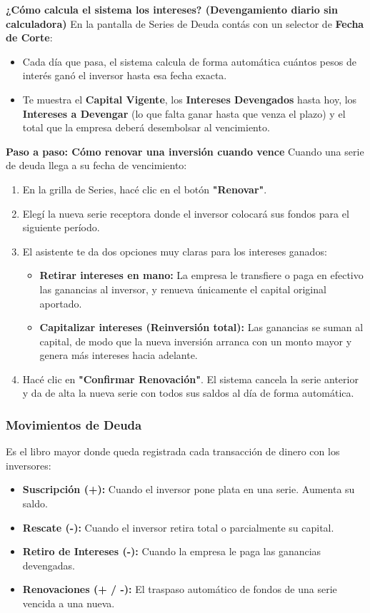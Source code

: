 \documentclass[12pt,a4paper]{article}
\renewcommand{\_}{\textunderscore\allowbreak}
\begin{document}
\textbf{¿Cómo calcula el sistema los intereses? (Devengamiento diario sin calculadora)}
En la pantalla de Series de Deuda contás con un selector de \textbf{Fecha de Corte}:
\begin{itemize}
    \item Cada día que pasa, el sistema calcula de forma automática cuántos pesos de interés ganó el inversor hasta esa fecha exacta.
    \item Te muestra el \textbf{Capital Vigente}, los \textbf{Intereses Devengados} hasta hoy, los \textbf{Intereses a Devengar} (lo que falta ganar hasta que venza el plazo) y el total que la empresa deberá desembolsar al vencimiento.
\end{itemize}

\textbf{Paso a paso: Cómo renovar una inversión cuando vence}
Cuando una serie de deuda llega a su fecha de vencimiento:
\begin{enumerate}
    \item En la grilla de Series, hacé clic en el botón \textbf{"Renovar"}.
    \item Elegí la nueva serie receptora donde el inversor colocará sus fondos para el siguiente período.
    \item El asistente te da dos opciones muy claras para los intereses ganados:
          \begin{itemize}
              \item \textbf{Retirar intereses en mano:} La empresa le transfiere o paga en efectivo las ganancias al inversor, y renueva únicamente el capital original aportado.
              \item \textbf{Capitalizar intereses (Reinversión total):} Las ganancias se suman al capital, de modo que la nueva inversión arranca con un monto mayor y genera más intereses hacia adelante.
          \end{itemize}
    \item Hacé clic en \textbf{"Confirmar Renovación"}. El sistema cancela la serie anterior y da de alta la nueva serie con todos sus saldos al día de forma automática.
\end{enumerate}

\subsubsection{Movimientos de Deuda}
Es el libro mayor donde queda registrada cada transacción de dinero con los inversores:
\begin{itemize}
    \item \textbf{Suscripción (+):} Cuando el inversor pone plata en una serie. Aumenta su saldo.
    \item \textbf{Rescate (-):} Cuando el inversor retira total o parcialmente su capital.
    \item \textbf{Retiro de Intereses (-):} Cuando la empresa le paga las ganancias devengadas.
    \item \textbf{Renovaciones (+ / -):} El traspaso automático de fondos de una serie vencida a una nueva.
\end{itemize}
\end{document}

